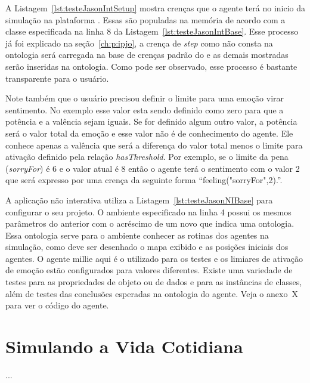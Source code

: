 A Listagem~\ref{lst:testeJasonIntSetup} mostra crenças que o agente terá
no inicio da simulação na plataforma \jason. Essas são populadas na memória
de acordo com a classe especificada na linha 8 da
Listagem~\ref{lst:testeJasonIntBase}. Esse processo já foi explicado na
seção~\ref{ch:p:ipjo}, a crença de \emph{step} como não
consta na ontologia será carregada na base de crenças padrão do \jason e as
demais mostradas serão inseridas na ontologia. Como pode ser observado, esse
processo é bastante transparente para o usuário.

Note também que o usuário precisou definir o limite para uma emoção virar
sentimento. No exemplo esse valor esta sendo definido como zero para que a
potência e a valência sejam iguais. Se for definido algum outro valor, a
potência será o valor total da emoção e esse valor não é de conhecimento do
agente. Ele conhece apenas a valência que será a diferença do valor total
menos o limite para ativação definido pela relação \emph{hasThreshold}. Por
exemplo, se o limite da pena (\emph{sorryFor}) é 6 e o valor atual é 8 então o
agente terá o sentimento com o valor 2 que será expresso por uma crença da
seguinte forma ``feeling("sorryFor",2).''.


\begin{center}
    \begin{minipage}{140mm}
	\lstset{linewidth=140mm}
	
    \end{minipage}
\end{center}

A aplicação não interativa utiliza a Listagem~\ref{lst:testeJasonNIBase} para
configurar o seu projeto. O ambiente especificado na linha 4 possui os mesmos
parâmetros do anterior com o acréscimo de um novo que indica uma ontologia.
Essa ontologia serve para o ambiente conhecer as rotinas dos agentes na
simulação, como deve ser desenhado o mapa exibido e as posições iniciais dos
agentes. O agente millie aqui é o utilizado para os testes e os limiares de
ativação de emoção estão configurados para valores diferentes. Existe uma
variedade de testes para as propriedades de objeto ou de dados e para as
instâncias de classes, além de testes das conclusões esperadas na ontologia do
agente. Veja o anexo~X para ver o código do agente.

\section{Simulando a Vida Cotidiana} \label{ch:cdu:svc}

...


